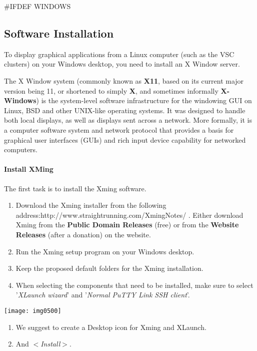 \#IFDEF WINDOWS

\subsection{Software Installation}

To display graphical applications from a Linux computer (such as the VSC clusters) on your Windows desktop, you need to install an X Window server.

The X Window system (commonly known as \textbf{X11}, based on its current major version being 11, or shortened to simply \textbf{X}, and sometimes informally \textbf{X-Windows}) is the system-level software infrastructure for the windowing GUI on Linux, BSD and other UNIX-like operating systems. It was designed to handle both local displays, as well as displays sent across a network. More formally, it is a computer software system and network protocol that provides a basis for graphical user interfaces (GUIs) and rich input device capability for networked computers.

\paragraph{ Install XMing}

The first task is to install the Xming software.

\begin{enumerate}
\item  Download the Xming installer from the following address:http://www.straightrunning.com/XmingNotes/ .  Either download Xming from the \textbf{Public Domain Releases} (free) or from the \textbf{Website Releases} (after a donation) on the website.
\item  Run the Xming setup program on your Windows desktop.
\item  Keep the proposed default folders for the Xming installation.
\item  When selecting the components that need to be installed, make sure to select '\textit{XLaunch wizard}' and '\textit{Normal PuTTY Link SSH client}'.
\end{enumerate}

\texttt{[image: img0500]}

\begin{enumerate}
\item  We suggest to create a Desktop icon for Xming and XLaunch.
\item  And $<$\textit{Install}$>$.
\end{enumerate}

